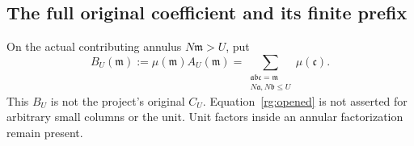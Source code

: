 \subsection{The full original coefficient and its finite prefix}
\label{rg:full-coefficient}
On the actual contributing annulus \(N\mathfrak m>U\), put
\begin{equation}\label{rg:opened}
 B_U(\mathfrak m):=\mu(\mathfrak m)A_U(\mathfrak m)
 =\sum_{\substack{\mathfrak a\mathfrak b\mathfrak c=\mathfrak m\\
                   N\mathfrak a,N\mathfrak b\le U}}\mu(\mathfrak c).
\end{equation}
This \(B_U\) is not the project's original \(C_U\).
Equation~\eqref{rg:opened} is not asserted for arbitrary small columns
or the unit. Unit factors inside an annular factorization remain present.

